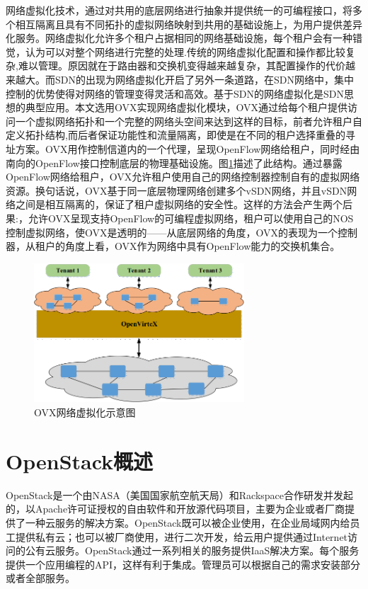 网络虚拟化技术\cite{Virtual-1}，通过对共用的底层网络进行抽象并提供统一的可编程接口，将多个相互隔离且具有不同拓扑的虚拟网络映射到共用的基础设施上，为用户提供差异化服务。网络虚拟化允许多个租户占据相同的网络基础设施，每个租户会有一种错觉，认为可以对整个网络进行完整的处理.传统的网络虚拟化配置和操作都比较复杂,难以管理。原因就在于路由器和交换机变得越来越复杂，其配置操作的代价越来越大。而SDN的出现为网络虚拟化开启了另外一条道路，在SDN网络中，集中控制的优势使得对网络的管理变得灵活和高效。基于SDN的网络虚拟化是SDN思想的典型应用。本文选用OVX实现网络虚拟化模块，OVX通过给每个租户提供访问一个虚拟网络拓扑和一个完整的网络头空间来达到这样的目标，前者允许租户自定义拓扑结构,而后者保证功能性和流量隔离，即使是在不同的租户选择重叠的寻址方案。OVX用作控制信道内的一个代理，呈现OpenFlow网络给租户，同时经由南向的OpenFlow接口控制底层的物理基础设施。图\ref{fig:ovx}描述了此结构。通过暴露OpenFlow网络给租户，OVX允许租户使用自己的网络控制器控制自有的虚拟网络资源。换句话说，OVX基于同一底层物理网络创建多个vSDN网络，并且vSDN网络之间是相互隔离的，保证了租户虚拟网络的安全性。这样的方法会产生两个后果:，允许OVX呈现支持OpenFlow的可编程虚拟网络，租户可以使用自己的NOS控制虚拟网络，使OVX是透明的——从底层网络的角度，OVX的表现为一个控制器，从租户的角度上看，OVX作为网络中具有OpenFlow能力的交换机集合\cite{OVX-2}。

\begin{figure}[!htb]
  \centering
  \includegraphics[width=0.7\textwidth]{logo/ovx.png}
  \caption{OVX网络虚拟化示意图}
  \label{fig:ovx}
\end{figure}
\section{OpenStack概述}
OpenStack是一个由NASA（美国国家航空航天局）和Rackspace合作研发并发起的，以Apache许可证授权的自由软件和开放源代码项目，主要为企业或者厂商提供了一种云服务的解决方案。OpenStack既可以被企业使用，在企业局域网内给员工提供私有云；也可以被厂商使用，进行二次开发，给云用户提供通过Internet访问的公有云服务。OpenStack通过一系列相关的服务提供IaaS解决方案。每个服务提供一个应用编程的API，这样有利于集成。管理员可以根据自己的需求安装部分或者全部服务。

